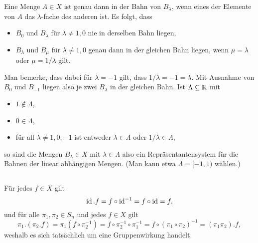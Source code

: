\begin{itemize}
    Eine Menge $A \in X$ ist genau dann in der Bahn von $B_\lambda$, wenn eines der Elemente von $A$ das $\lambda$-fache des anderen ist.
    Es folgt, dass
    \begin{itemize}
      \item
        $B_0$ und $B_\lambda$ für $\lambda \neq 1, 0$ nie in derselben Bahn liegen,
      \item
        $B_\lambda$ und $B_\mu$ für $\lambda \neq 1, 0$ genau dann in der gleichen Bahn liegen, wenn $\mu = \lambda$ oder $\mu = 1/\lambda$ gilt.
    \end{itemize}
    Man bemerke, dass dabei für $\lambda = -1$ gilt, dass $1/\lambda = -1 = \lambda$.
    Mit Ausnahme von $B_0$ und $B_{-1}$ liegen also je zwei $B_\lambda$ in der gleichen Bahn.
    Ist $\Lambda \subseteq \mathbb{R}$ mit
    \begin{itemize}
      \item
        $1 \notin \Lambda$,
      \item
        $0 \in \Lambda$,
      \item
        für all $\lambda \neq 1, 0, -1$ ist entweder $\lambda \in \Lambda$ oder $1/\lambda \in \Lambda$,
    \end{itemize}
    so  sind die Mengen $B_\lambda \in X$ mit $\lambda \in \Lambda$ also ein Repräsentantensystem für die Bahnen der linear abhängigen Mengen.
    (Man kann etwa $\Lambda = [-1, 1)$ wählen.)
    
\end{itemize}





\addtocounter{subsection}{1}





\addtocounter{subsection}{1}





\subsection{}

Für jedes $f \in X$ gilt
\[
    \operatorname{id}.f
  = f \circ \operatorname{id}^{-1}
  = f \circ \operatorname{id}
  = f,
\]
und für alle $\pi_1, \pi_2 \in S_n$ und jedes $f \in X$ gilt
\[
    \pi_1.(\pi_2.f)
  = \pi_1(f \circ \pi_2^{-1})
  = f \circ \pi_2^{-1} \circ \pi_1^{-1}
  = f \circ (\pi_1 \circ \pi_2)^{-1}
  = (\pi_1 \pi_2).f,
\]
weshalb es sich tatsächlich um eine Gruppenwirkung handelt.

